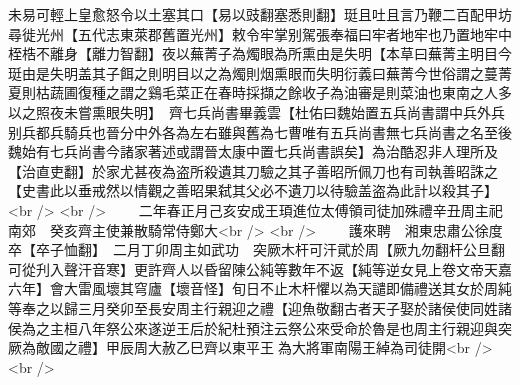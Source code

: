 未易可輕上皇愈怒令以土塞其口【易以豉翻塞悉則翻】珽且吐且言乃鞭二百配甲坊尋徙光州【五代志東萊郡舊置光州】敕令牢掌别駕張奉福曰牢者地牢也乃置地牢中桎梏不離身【離力智翻】夜以蕪菁子為燭眼為所熏由是失明【本草曰蕪菁主明目今珽由是失明盖其子餌之則明目以之為燭則烟熏眼而失明衍義曰蕪菁今世俗謂之蔓菁夏則枯蔬圃復種之謂之鷄毛菜正在春時採擷之餘收子為油審是則菜油也東南之人多以之照夜未嘗熏眼失明】　齊七兵尚書畢義雲【杜佑曰魏始置五兵尚書謂中兵外兵别兵都兵騎兵也晉分中外各為左右雖與舊為七曹唯有五兵尚書無七兵尚書之名至後魏始有七兵尚書今諸家著述或謂晉太康中置七兵尚書誤矣】為治酷忍非人理所及【治直吏翻】於家尤甚夜為盗所殺遺其刀驗之其子善昭所佩刀也有司執善昭誅之【史書此以垂戒然以情觀之善昭果弑其父必不遺刀以待驗盖盗為此計以殺其子】<br />
<br />
　　二年春正月己亥安成王頊進位太傅領司徒加殊禮辛丑周主祀南郊　癸亥齊主使兼散騎常侍鄭大<br />
<br />
　　護來聘　湘東忠肅公徐度卒【卒子恤翻】　二月丁卯周主如武功　突厥木杆可汗貮於周【厥九勿翻杆公旦翻可從刋入聲汗音寒】更許齊人以昏留陳公純等數年不返【純等逆女見上卷文帝天嘉六年】會大雷風壞其穹廬【壞音怪】旬日不止木杆懼以為天譴即備禮送其女於周純等奉之以歸三月癸卯至長安周主行親迎之禮【迎魚敬翻古者天子娶於諸侯使同姓諸侯為之主桓八年祭公來遂逆王后於紀杜預注云祭公來受命於魯是也周主行親迎與突厥為敵國之禮】甲辰周大赦乙巳齊以東平王為大將軍南陽王綽為司徒開<br />
<br />
